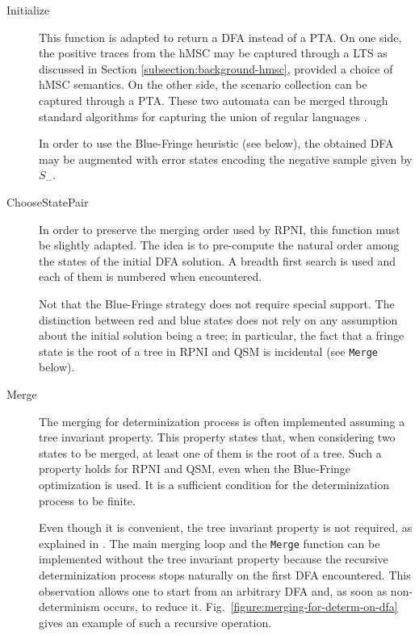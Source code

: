 \begin{description}

\item[Initialize] This function is adapted to return a DFA instead of a PTA. On one side, the positive traces from the hMSC may be captured through a LTS as discussed in Section \ref{subsection:background-hmsc}, provided a choice of hMSC semantics. On the other side, the scenario collection can be captured through a PTA. These two automata can be merged through standard algorithms for capturing the union of regular languages \cite{Hopcroft:1979}. 

In order to use the Blue-Fringe heuristic (see below), the obtained DFA may be augmented with error states encoding the negative sample given by $S_-$. 

\item[ChooseStatePair] In order to preserve the merging order used by RPNI, this function must be slightly adapted. The idea is to pre-compute the natural order among the states of the initial DFA solution. A breadth first search is used and each of them is numbered when encountered. 

Not that the Blue-Fringe strategy does not require special support. The distinction between red and blue states does not rely on any assumption about the initial solution being a tree; in particular, the fact that a fringe state is the root of a tree in RPNI and QSM is incidental (see \texttt{Merge} below).

\item[Merge] The merging for determinization process is often implemented assuming a tree invariant property. This property states that, when considering two states to be merged, at least one of them is the root of a tree. Such a property holds for RPNI and QSM, even when the Blue-Fringe optimization is used. It is a sufficient condition for the determinization process to be finite. 

Even though it is convenient, the tree invariant property is not required, as explained in \cite{Lambeau:2008}. The main merging loop and the \texttt{Merge} function can be implemented without the tree invariant property because the recursive determinization process stops naturally on the first DFA encountered. This observation allows one to start from an arbitrary DFA and, as soon as non-determinism occurs, to reduce it. Fig.~\ref{figure:merging-for-determ-on-dfa} gives an example of such a recursive operation.

\end{description}


